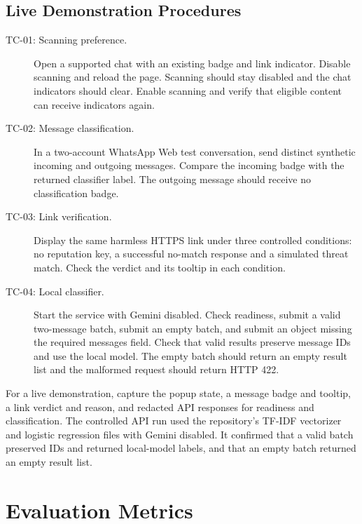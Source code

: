\documentclass[12pt,letterpaper,twoside,openany]{book}
\begin{document}
\subsection{Live Demonstration Procedures}

\begin{description}
  \item[TC-01: Scanning preference.] Open a supported chat with an existing badge and link indicator. Disable scanning and reload the page. Scanning should stay disabled and the chat indicators should clear. Enable scanning and verify that eligible content can receive indicators again.
  \item[TC-02: Message classification.] In a two-account WhatsApp Web test conversation, send distinct synthetic incoming and outgoing messages. Compare the incoming badge with the returned classifier label. The outgoing message should receive no classification badge.
  \item[TC-03: Link verification.] Display the same harmless HTTPS link under three controlled conditions: no reputation key, a successful no-match response and a simulated threat match. Check the verdict and its tooltip in each condition.
  \item[TC-04: Local classifier.] Start the service with Gemini disabled. Check readiness, submit a valid two-message batch, submit an empty batch, and submit an object missing the required messages field. Check that valid results preserve message IDs and use the local model. The empty batch should return an empty result list and the malformed request should return HTTP 422.
\end{description}

For a live demonstration, capture the popup state, a message badge and tooltip, a link verdict and reason, and redacted API responses for readiness and classification. The controlled API run used the repository's TF-IDF vectorizer and logistic regression files with Gemini disabled. It confirmed that a valid batch preserved IDs and returned local-model labels, and that an empty batch returned an empty result list.

\section{Evaluation Metrics}
\end{document}
